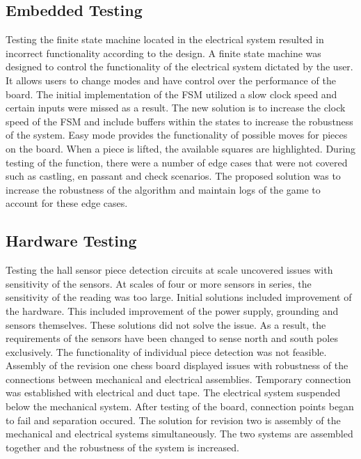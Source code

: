 \documentclass[12pt, titlepage]{article}
\begin{document}
\subsection{Embedded Testing} 
Testing the finite state machine located in the electrical system resulted in 
incorrect functionality according to the design. A finite state machine was 
designed to control the functionality of the electrical system dictated by the
user. It allows users to change modes and have control over the performance 
of the board. The initial implementation of the FSM utilized a slow clock speed
and certain inputs were missed as a result. The new solution is to increase the
clock speed of the FSM and include buffers within the states to increase the
robustness of the system. 
\newline
\newline
Easy mode provides the functionality of possible moves for pieces on the board.
When a piece is lifted, the available squares are highlighted. During testing of 
the function, there were a number of edge cases that were not covered such as 
castling, en passant and check scenarios. The proposed solution was to increase
the robustness of the algorithm and maintain logs of the game to account for
these edge cases. 

\subsection{Hardware Testing}
Testing the hall sensor piece detection circuits at scale uncovered issues
with sensitivity of the sensors. At scales of four or more sensors in series, 
the sensitivity of the reading was too large. Initial solutions included 
improvement of the hardware. This included improvement of the power supply, 
grounding and sensors themselves. These solutions did not solve the issue. As 
a result, the requirements of the sensors have been changed to sense north and 
south poles exclusively. The functionality of individual piece detection was not
feasible. 
\newline
\newline
Assembly of the revision one chess board displayed issues with robustness of the
connections between mechanical and electrical assemblies. Temporary connection 
was established with electrical and duct tape. The electrical system suspended 
below the mechanical system. After testing of the board, connection points began 
to fail and separation occured. The solution for revision two is assembly of the
mechanical and electrical systems simultaneously. The two systems are assembled 
together and the robustness of the system is increased.
\end{document}
